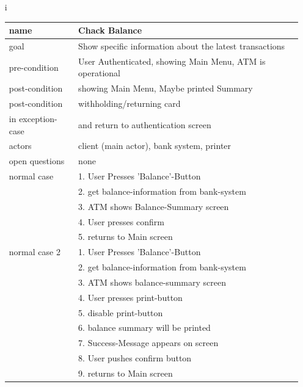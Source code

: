 \documentclass{scrartcl}
\begin{document}
\begin{itemize}
    \item[i]
        \begin{tabular}{|l|l|}
            \hline
            name            & Chack Balance \\ \hline
            goal            & Show specific information about the latest transactions \\ \hline
            pre-condition   & User Authenticated, showing Main Menu, ATM is operational \\ \hline
            post-condition  & showing Main Menu, Maybe printed Summary \\ \hline
            post-condition  & withholding/returning card \\
            in exception-case & and return to authentication screen \\ \hline
            actors          & client (main actor), bank system, printer\\ \hline
            open questions  & none \\ \hline
            normal case     & 1. User Presses 'Balance'-Button \\
                            & 2. get balance-information from bank-system \\
                            & 3. ATM shows Balance-Summary screen \\
                            & 4. User presses confirm \\
                            & 5. returns to Main screen \\ \hline
            normal case 2   & 1. User Presses 'Balance'-Button \\
                            & 2. get balance-information from bank-system \\
                            & 3. ATM shows balance-summary screen \\
                            & 4. User presses print-button \\
                            & 5. disable print-button \\
                            & 6. balance summary will be printed \\
                            & 7. Success-Message appears on screen \\
                            & 8. User pushes confirm button \\
                            & 9. returns to Main screen \\ \hline

\end{tabular}
\end{itemize}
\end{document}
